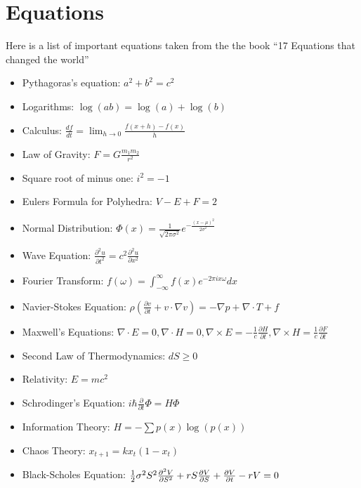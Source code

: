\documentclass[10pt,a4paper]{article}
\begin{document}
\section{Equations}
Here is a list of important equations taken from the the book ``17 Equations that changed the world''
\begin{itemize}
	\item Pythagoras's equation: $a^2 + b^2 = c^2$
	\item Logarithms: $\log\left(ab\right) = \log\left(a\right) + \log\left(b\right) $
	\item Calculus: $\frac{df}{dt }= \lim_{h \to 0}\frac{f\left(x + h\right) - f\left(x\right)}{h}$
	\item  Law of Gravity: $F = G\frac{m_{1}m_{2}}{r^{2}}$
	\item Square root of minus one: $i^{2} = -1$
	\item Eulers Formula for Polyhedra: $V - E + F = 2$
	\item Normal Distribution: $\Phi\left(x\right) = \frac{1}{\sqrt{2 \pi \sigma^{2}}}e^{-\frac{\left( x- \mu\right)^{2}}{2\sigma^{2}}}$
	\item Wave Equation: $\frac{\partial^{2} u }{\partial t^{2}} = c^{2}\frac{\partial^{2}u}{\partial x^{2}}$
	\item Fourier Transform: $f(\omega) = \int_{-\infty}^{\infty}f(x)e^{-2 \pi i x \omega}dx$
	\item Navier-Stokes Equation: $\rho \left ( \frac{\partial v}{\partial t} + v \cdot \nabla v\right) = - \nabla p + \nabla \cdot T + f$
	\item Maxwell's Equations: $\nabla \cdot E = 0, \nabla \cdot H = 0, \nabla \times E = -\frac{1}{c} \frac{\partial H}{\partial t}, \nabla \times H = \frac{1}{c}\frac{\partial F}{\partial t}$
	\item Second Law of Thermodynamics: $dS \geq 0$
	\item Relativity: $E = m c^{2}$
	\item Schrodinger's Equation: $i\hbar \frac{\partial}{\partial t}\Phi = H \Phi$
	\item Information Theory: $H = -\sum p(x) \log(p(x))$
	\item Chaos Theory: $x_{t+1} = k x_{t}(1 - x_{t})$
	\item Black-Scholes Equation: $\frac{1}{2}\sigma^{2} S^{2} \frac{\partial^{2} V}{\partial S^{2}}+ rS\frac{\partial V}{\partial S} + \frac{\partial V}{\partial t} - rV = 0\\
	$
\end{itemize}
\end{document}
